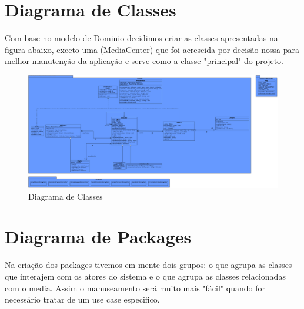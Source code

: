 \documentclass[a4paper]{report}
\begin{document}
\chapter{Diagrama de Classes}

Com base no modelo de Dominio decidimos criar as classes apresentadas na figura abaixo,
exceto uma (MediaCenter) que foi acrescida por decisão nossa para melhor manutenção
da aplicação e serve como a classe "principal" do projeto.

\begin{figure}[H]
	\centering 
    \includegraphics[width=\textwidth]{images/classdiagram.png}  
    \caption{Diagrama de Classes}
\end{figure}

\chapter{Diagrama de Packages}

Na criação dos packages tivemos em mente dois grupos: o que agrupa as classes que 
interajem com os atores do sistema e o que agrupa as classes relacionadas com o media.
Assim o manuseamento será muito mais "fácil" quando for necessário tratar de um use case
especifico.
\end{document}
